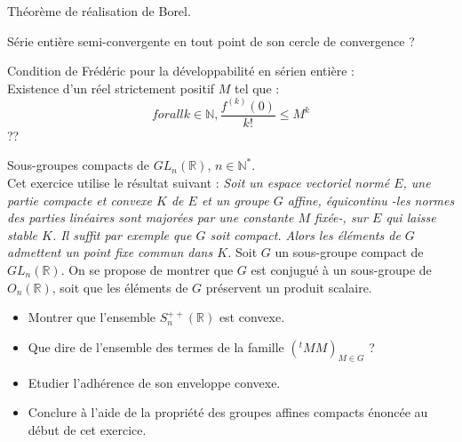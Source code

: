Théorème de réalisation de Borel.

Série entière semi-convergente en tout point de son cercle de convergence ?

Condition de Frédéric pour la développabilité en sérien entière :\\
Existence d'un réel strictement positif $M$ tel que :
\[forall k \in \mathbb{N} , \frac{f^{(k)}(0)}{k!} \leq M^k\]
??

\begin{exer}
Sous-groupes compacts de $GL_n(\mathbb{R})$, $n \in \mathbb{N}^{\ast}$.\\
Cet exercice utilise le résultat suivant :
\textit{
Soit un espace vectoriel normé $E$, une partie compacte et convexe $K$ de $E$ et un groupe $G$ affine, %
équicontinu -les normes des parties linéaires sont majorées par une constante $M$ fixée-, sur $E$ qui laisse stable $K$. %
Il suffit par exemple que $G$ soit compact. %
Alors les éléments de $G$ admettent un point fixe commun dans $K$.
}
Soit $G$ un sous-groupe compact de $GL_n(\mathbb{R})$. %
On se propose de montrer que $G$ est conjugué à un sous-groupe de $O_n(\mathbb{R})$, %
soit que les éléments de $G$ préservent un produit scalaire.
\begin{itemize}
\item Montrer que l'ensemble $S_n^{++}(\mathbb{R})$ est convexe.
\item Que dire de l'ensemble des termes de la famille $(^tMM)_{M \in G}$ ?
\item Etudier l'adhérence de son enveloppe convexe.
\item Conclure à l'aide de la propriété des groupes affines compacts énoncée au début de cet exercice.
\end{itemize}
\end{exer}

